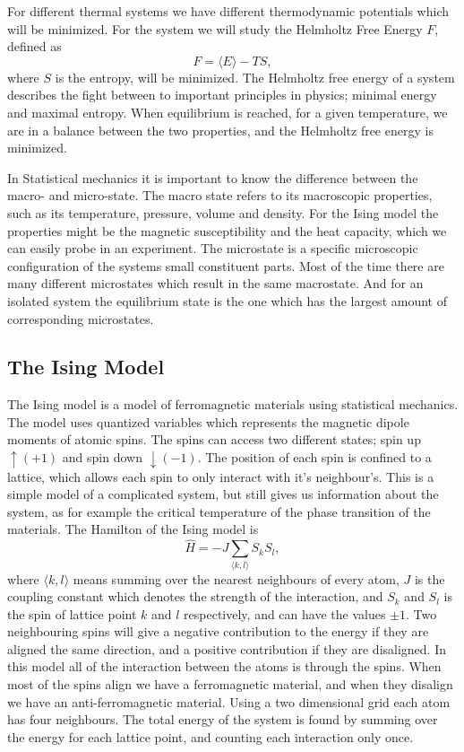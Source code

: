 \documentclass[%
 reprint,
nofootinbib,
aps,
]{revtex4-1}
\begin{document}
For different thermal systems we have different thermodynamic potentials which will be minimized. For the system we will study the Helmholtz Free Energy $F$, defined as
\begin{equation}
    F = \langle E \rangle - TS,
\end{equation}
where $S$ is the entropy, will be minimized. The Helmholtz free energy of a system describes the fight between to important principles in physics; minimal energy and maximal entropy. When equilibrium is reached, for a given temperature, we are in a balance between the two properties, and the Helmholtz free energy is minimized.


In Statistical mechanics it is important to know the difference between the macro- and micro-state. The macro state refers to its macroscopic properties, such as its temperature, pressure, volume and density. For the Ising model the properties might be the magnetic susceptibility and the heat capacity, which we can easily probe in an experiment. The microstate is a specific microscopic configuration of the systems small constituent parts. Most of the time there are many different microstates which result in the same macrostate. And for an isolated system the equilibrium state is the one which has the largest amount of corresponding microstates.

\subsection{The Ising Model}
The Ising model is a model of ferromagnetic materials using statistical mechanics. The model uses quantized variables which represents the magnetic dipole moments of atomic spins. The spins can access two different states; spin up $\uparrow (+1)$ and spin down $\downarrow (-1)$. The position of each spin is confined to a lattice, which allows each spin to only interact with it's neighbour's. This is a simple model of a complicated system, but still gives us information about the system, as for example the critical temperature of the phase transition of the materials. The Hamilton of the Ising model is
\begin{equation}
    \hat{H} = -J\sum_{\langle k, l \rangle} S_kS_l, \label{eq:hamil}
\end{equation}
where $\langle k, l\rangle$ means summing over the nearest neighbours of every atom, $J$ is the coupling constant which denotes the strength of the interaction, and $S_k$ and $S_l$ is the spin of lattice point $k$ and $l$ respectively, and can have the values $\pm 1$. Two neighbouring spins will give a negative contribution to the energy if they are aligned the same direction, and a positive contribution if they are disaligned. In this model all of the interaction between the atoms is through the spins. When most of the spins align we have a ferromagnetic material, and when they disalign we have an anti-ferromagnetic material. Using a two dimensional grid each atom has four neighbours. The total energy of the system is found by summing over the energy for each lattice point, and counting each interaction only once.
\end{document}
